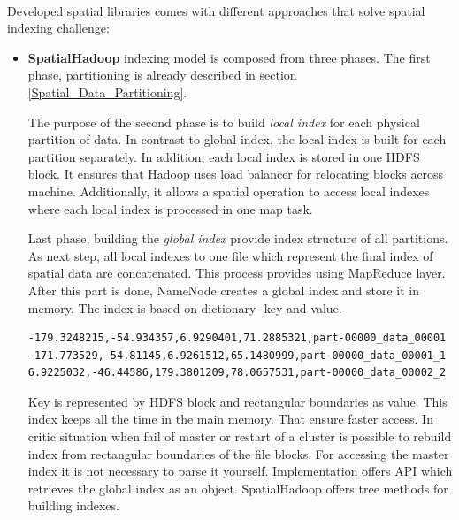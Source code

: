 \documentclass[a4paper,12pt,oneside]{report}
\begin{document}
	\paragraph{} Developed spatial libraries comes with different approaches that
	solve  spatial indexing challenge:
	\begin{itemize}
		\item \textbf{SpatialHadoop} indexing model is composed from three phases. The
		first phase, partitioning is already described in section \ref{Spatial_Data_Partitioning}.

		The purpose of the second phase is to build \textit{local index}  for each
		physical partition of data. 
		In contrast to global index, the local index is built for each partition
		separately. In addition, each local 
		index is stored in one HDFS block. It ensures that Hadoop uses load balancer for
		relocating blocks 
		across machine. Additionally, it allows  a spatial operation to access local
		indexes where each local 
		index is processed in one map task. 
		
		Last phase, building the \textit{global index} provide index structure of all
		partitions. As next step, 
		all local indexes to one file which represent the final index of spatial data
		are concatenated. This process 
		provides using MapReduce  layer. After this part is done, NameNode creates a
		global index
		and store it in memory. The index is based on dictionary- key and value.
		
		\begin{footnotesize}
			\begin{lstlisting}[style=mybash]
-179.3248215,-54.934357,6.9290401,71.2885321,part-00000_data_00001
-171.773529,-54.81145,6.9261512,65.1480999,part-00000_data_00001_1
6.9225032,-46.44586,179.3801209,78.0657531,part-00000_data_00002_2
			\end{lstlisting}\end{footnotesize}
		
		
		Key is represented by HDFS block and  rectangular boundaries as value. This
		index keeps all the 
		time in the main memory. That ensure faster access. In critic situation when
		fail of master or 
		restart of a cluster is possible to rebuild index from rectangular boundaries of
		the file blocks. 
		For accessing the master index it is not necessary to parse it yourself.
		Implementation offers API 
		which retrieves the global index as an object.
		SpatialHadoop offers tree methods for building indexes. 
		

\end{itemize}
\end{document}
